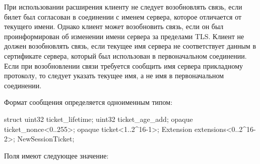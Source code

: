 При использовании расширения  клиенту
не следует возобновлять связь, если билет был согласован в соединении с именем 
сервера, которое отличается от текущего имени.
%
%
Однако клиент может возобновить связь, если он был проинформирован об изменении 
имени сервера за пределами TLS.
%
Клиент не должен возобновлять связь, если текущее имя сервера не соответствует 
данным в сертификате сервера, который был использован в первоначальном соединении.
%
Если при возобновлении связи требуется сообщить имя сервера прикладному 
протоколу, то следует указать текущее имя, а не имя в первоначальном соединении.
%

Формат сообщения  определяется одноименным типом:
%
\begin{codeblock}
struct {
  uint32 ticket_lifetime;
  uint32 ticket_age_add;
  opaque ticket_nonce<0..255>;
  opaque ticket<1..2^16-1>;
  Extension extensions<0..2^16-2>;
} NewSessionTicket;
\end{codeblock}

Поля  имеют следующее значение:

